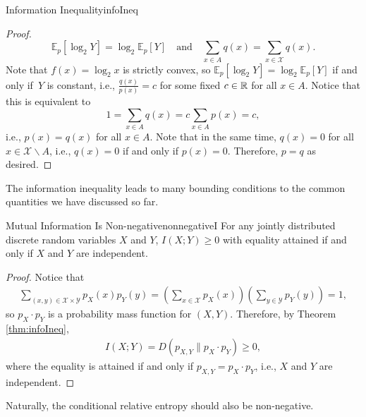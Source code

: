 \documentclass[math, code]{amznotes}
\theoremstyle{remark}
\begin{document}
\begin{thmbox}{Information Inequality}{infoIneq}
\begin{proof}
        \begin{equation*}
            \mathbb{E}_p\left[\log_2Y\right] = \log_2\mathbb{E}_p\left[Y\right] \quad\textrm{and}\quad \sum_{x \in A}q\left(x\right) = \sum_{x \in \mathcal{X}}q\left(x\right).
        \end{equation*}
        Note that $f\left(x\right) = \log_2x$ is strictly convex, so $\mathbb{E}_p\left[\log_2Y\right] = \log_2\mathbb{E}_p\left[Y\right]$ if and only if~$Y$ is constant, i.e., $\frac{q\left(x\right)}{p\left(x\right)} = c$ for some fixed $c \in \mathbb{R}$ for all $x \in A$. Notice that this is equivalent to 
        \begin{equation*}
            1 = \sum_{x \in A}q\left(x\right) = c\sum_{x \in A}p\left(x\right) = c,
        \end{equation*}
        i.e., $p\left(x\right) = q\left(x\right)$ for all $x \in A$. Note that in the same time, $q\left(x\right) = 0$ for all $x \in \mathcal{X} \backslash A$, i.e., $q\left(x\right) = 0$ if and only if $p\left(x\right) = 0$. Therefore, $p = q$ as desired.
    \end{proof}
\end{thmbox}
The information inequality leads to many bounding conditions to the common quantities we have discussed so far.
\begin{corbox}{Mutual Information Is Non-negative}{nonnegativeI}
    For any jointly distributed discrete random variables $X$ and $Y$, $I\left(X ; Y\right) \geq 0$ with equality attained if and only if $X$ and $Y$ are independent.
    \tcblower
    \begin{proof}
        Notice that 
        \begin{align*}
            \sum_{\left(x, y\right) \in \mathcal{X \times Y}}p_X\left(x\right)p_Y\left(y\right) = \left(\sum_{x \in \mathcal{X}}p_X\left(x\right)\right)\left(\sum_{y \in \mathcal{Y}}p_Y\left(y\right)\right) = 1,
        \end{align*}
        so $p_X \cdot p_Y$ is a probability mass function for $\left(X, Y\right)$. Therefore, by Theorem \ref{thm:infoIneq}, 
        \begin{align*}
            I\left(X ; Y\right) = D\left(p_{X, Y} \parallel p_X \cdot p_Y\right) \geq 0,
        \end{align*}
        where the equality is attained if and only if $p_{X, Y} = p_X \cdot p_Y$, i.e., $X$ and $Y$ are independent.
    \end{proof}
\end{corbox}
Naturally, the conditional relative entropy should also be non-negative.
\end{document}
